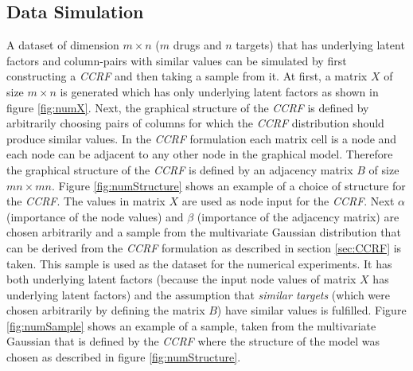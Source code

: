 \subsection{Data Simulation}

A dataset of dimension $m \times n$ ($m$ drugs and $n$ targets) that has underlying latent factors and column-pairs with similar values can be simulated by first constructing a \textit{CCRF} and then taking a sample from it. At first, a matrix $X$ of size $m \times n$ is generated which has only underlying latent factors as shown in figure \ref{fig:numX}. Next, the graphical structure of the \textit{CCRF} is defined by arbitrarily choosing pairs of columns for which the \textit{CCRF} distribution should produce similar values. In the \textit{CCRF} formulation each matrix cell is a node and each node can be adjacent to any other node in the graphical model. Therefore the graphical structure of the \textit{CCRF} is defined by an adjacency matrix $B$ of size $mn \times mn$. Figure \ref{fig:numStructure} shows an example of a choice of structure for the \textit{CCRF}.  The values in matrix $X$ are used as node input for the \textit{CCRF}. Next $\alpha$ (importance of the node values) and $\beta$ (importance of the adjacency matrix) are chosen arbitrarily and a sample from the multivariate Gaussian distribution that can be derived from the \textit{CCRF} formulation as described in section \ref{sec:CCRF} is taken. This sample is used as the dataset for the numerical experiments. It has both underlying latent factors (because the input node values of matrix $X$ has underlying latent factors) and the assumption that \textit{similar targets} (which were chosen arbitrarily by defining the matrix $B$) have similar values is fulfilled. Figure \ref{fig:numSample} shows an example of a sample, taken from the multivariate Gaussian that is defined by the \textit{CCRF} where the structure of the model was chosen as described in figure \ref{fig:numStructure}.

